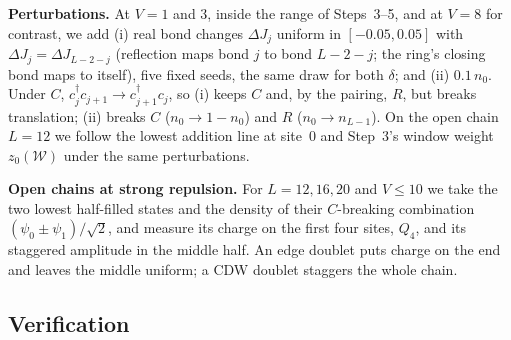 \documentclass[11pt,a4paper]{article}
\newcommand{\dg}{^{\dagger}}
\begin{document}
\textbf{Perturbations.}
At $V=1$ and $3$, inside the range of Steps~3--5, and at $V=8$ for contrast, we add (i) real bond changes $\Delta J_j$ uniform in $[-0.05,0.05]$ with $\Delta J_j=\Delta J_{L-2-j}$ (reflection maps bond $j$ to bond $L-2-j$; the ring's closing bond maps to itself), five fixed seeds, the same draw for both $\delta$; and (ii) $0.1\,n_0$.
Under $C$, $c_j\dg c_{j+1}\to c_{j+1}\dg c_j$, so (i) keeps $C$ and, by the pairing, $R$, but breaks translation; (ii) breaks $C$ ($n_0\to1-n_0$) and $R$ ($n_0\to n_{L-1}$).
On the open chain $L=12$ we follow the lowest addition line at site~0 and Step~3's window weight $z_0(\mathcal W)$ under the same perturbations.

\textbf{Open chains at strong repulsion.}
For $L=12,16,20$ and $V\le10$ we take the two lowest half-filled states and the density of their $C$-breaking combination $(\psi_0\pm\psi_1)/\sqrt2$, and measure its charge on the first four sites, $Q_4$, and its staggered amplitude in the middle half.
An edge doublet puts charge on the end and leaves the middle uniform; a CDW doublet staggers the whole chain.

\subsection{Verification}
\end{document}
